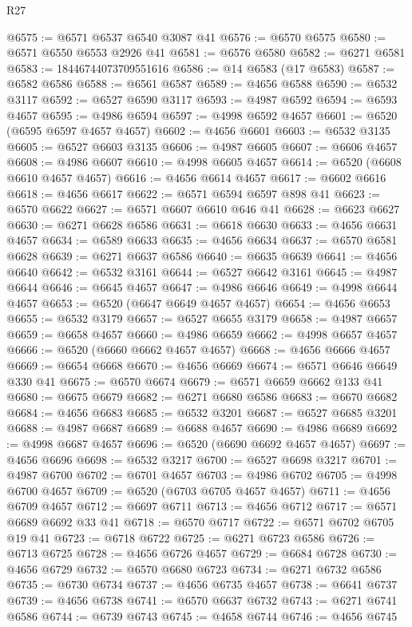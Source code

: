 \begin{lexlean}{R27}
\begin{coremodule}
@6575 := @6571 @6537 @6540 @3087 @41
@6576 := @6570 @6575
@6580 := @6571 @6550 @6553 @2926 @41
@6581 := @6576 @6580
@6582 := @6271 @6581
@6583 := 18446744073709551616
@6586 := @14 @6583 (@17 @6583)
@6587 := @6582 @6586
@6588 := @6561 @6587
@6589 := @4656 @6588
@6590 := @6532 @3117
@6592 := @6527 @6590 @3117
@6593 := @4987 @6592
@6594 := @6593 @4657
@6595 := @4986 @6594
@6597 := @4998 @6592 @4657
@6601 := @6520 (@6595 @6597 @4657 @4657)
@6602 := @4656 @6601
@6603 := @6532 @3135
@6605 := @6527 @6603 @3135
@6606 := @4987 @6605
@6607 := @6606 @4657
@6608 := @4986 @6607
@6610 := @4998 @6605 @4657
@6614 := @6520 (@6608 @6610 @4657 @4657)
@6616 := @4656 @6614 @4657
@6617 := @6602 @6616
@6618 := @4656 @6617
@6622 := @6571 @6594 @6597 @898 @41
@6623 := @6570 @6622
@6627 := @6571 @6607 @6610 @646 @41
@6628 := @6623 @6627
@6630 := @6271 @6628 @6586
@6631 := @6618 @6630
@6633 := @4656 @6631 @4657
@6634 := @6589 @6633
@6635 := @4656 @6634
@6637 := @6570 @6581 @6628
@6639 := @6271 @6637 @6586
@6640 := @6635 @6639
@6641 := @4656 @6640
@6642 := @6532 @3161
@6644 := @6527 @6642 @3161
@6645 := @4987 @6644
@6646 := @6645 @4657
@6647 := @4986 @6646
@6649 := @4998 @6644 @4657
@6653 := @6520 (@6647 @6649 @4657 @4657)
@6654 := @4656 @6653
@6655 := @6532 @3179
@6657 := @6527 @6655 @3179
@6658 := @4987 @6657
@6659 := @6658 @4657
@6660 := @4986 @6659
@6662 := @4998 @6657 @4657
@6666 := @6520 (@6660 @6662 @4657 @4657)
@6668 := @4656 @6666 @4657
@6669 := @6654 @6668
@6670 := @4656 @6669
@6674 := @6571 @6646 @6649 @330 @41
@6675 := @6570 @6674
@6679 := @6571 @6659 @6662 @133 @41
@6680 := @6675 @6679
@6682 := @6271 @6680 @6586
@6683 := @6670 @6682
@6684 := @4656 @6683
@6685 := @6532 @3201
@6687 := @6527 @6685 @3201
@6688 := @4987 @6687
@6689 := @6688 @4657
@6690 := @4986 @6689
@6692 := @4998 @6687 @4657
@6696 := @6520 (@6690 @6692 @4657 @4657)
@6697 := @4656 @6696
@6698 := @6532 @3217
@6700 := @6527 @6698 @3217
@6701 := @4987 @6700
@6702 := @6701 @4657
@6703 := @4986 @6702
@6705 := @4998 @6700 @4657
@6709 := @6520 (@6703 @6705 @4657 @4657)
@6711 := @4656 @6709 @4657
@6712 := @6697 @6711
@6713 := @4656 @6712
@6717 := @6571 @6689 @6692 @33 @41
@6718 := @6570 @6717
@6722 := @6571 @6702 @6705 @19 @41
@6723 := @6718 @6722
@6725 := @6271 @6723 @6586
@6726 := @6713 @6725
@6728 := @4656 @6726 @4657
@6729 := @6684 @6728
@6730 := @4656 @6729
@6732 := @6570 @6680 @6723
@6734 := @6271 @6732 @6586
@6735 := @6730 @6734
@6737 := @4656 @6735 @4657
@6738 := @6641 @6737
@6739 := @4656 @6738
@6741 := @6570 @6637 @6732
@6743 := @6271 @6741 @6586
@6744 := @6739 @6743
@6745 := @4658 @6744
@6746 := @4656 @6745

\end{coremodule}
\end{lexlean}
